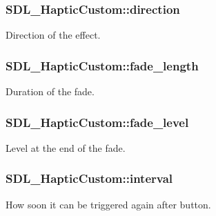 \subsubsection[{\texorpdfstring{direction}{direction}}]{ S\+D\+L\+\_\+\+Haptic\+Custom\+::direction}\hypertarget{struct_s_d_l___haptic_custom_ad7eb84f59404d9e0da07570b4b57dd43}{}\label{struct_s_d_l___haptic_custom_ad7eb84f59404d9e0da07570b4b57dd43}
Direction of the effect. 
\subsubsection[{\texorpdfstring{fade\+\_\+length}{fade_length}}]{ S\+D\+L\+\_\+\+Haptic\+Custom\+::fade\+\_\+length}\hypertarget{struct_s_d_l___haptic_custom_ab47fac94baeba28a3acd6c706e0b6a5c}{}\label{struct_s_d_l___haptic_custom_ab47fac94baeba28a3acd6c706e0b6a5c}
Duration of the fade. 
\subsubsection[{\texorpdfstring{fade\+\_\+level}{fade_level}}]{ S\+D\+L\+\_\+\+Haptic\+Custom\+::fade\+\_\+level}\hypertarget{struct_s_d_l___haptic_custom_a73a522581eb514d032e500ec6294fe50}{}\label{struct_s_d_l___haptic_custom_a73a522581eb514d032e500ec6294fe50}
Level at the end of the fade. 
\subsubsection[{\texorpdfstring{interval}{interval}}]{ S\+D\+L\+\_\+\+Haptic\+Custom\+::interval}\hypertarget{struct_s_d_l___haptic_custom_afdeb26b1709254545e00a59a0a6c360c}{}\label{struct_s_d_l___haptic_custom_afdeb26b1709254545e00a59a0a6c360c}
How soon it can be triggered again after button. 
